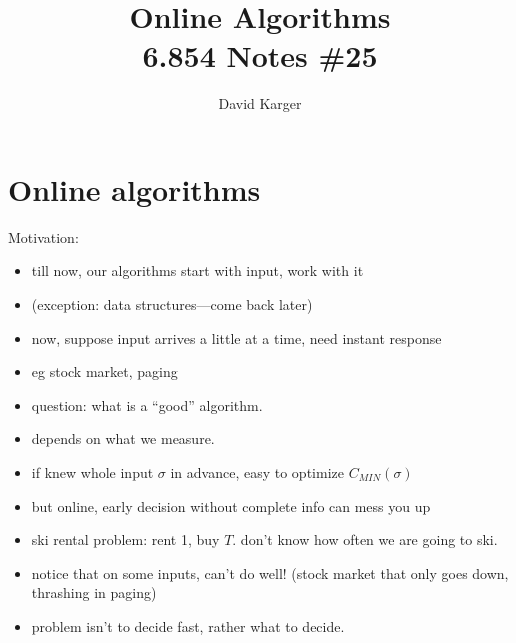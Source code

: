 \documentclass{article}
\title{Online Algorithms\\ 6.854 Notes \#25}
\author{David Karger}
\begin{document}
\def\OPT{\mbox{OPT}}

\section{Online algorithms}

Motivation:
\begin{itemize}
\item till now, our algorithms start with input, work with it
\item (exception: data structures---come back later)
\item now, suppose input arrives a little at a time, need instant
  response
\item eg stock market, paging
\item question: what is a ``good'' algorithm.
\item depends on what we measure.
\item if knew whole input $\sigma $ in advance, easy to optimize
  $C_{MIN}(\sigma)$
\item but online, early decision without complete info can mess you up 
\item ski rental problem: rent 1, buy $T$.  don't know how often we are going to ski.
\item notice that on some inputs, can't do well! (stock market that
  only goes down, thrashing in paging)
\item problem isn't to decide fast, rather what to decide.
\end{itemize}
\end{document}
